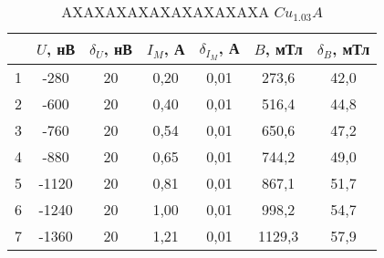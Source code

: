 \begin{table}
\centering
\caption{AXAXAXAXAXAXAXAXAXA $Cu_1.03A$}
\begin{tabular}{|c|c|c|c|c|c|c|}
\hline
 & $U$, нВ & $\delta_U$, нВ & $I_M$, А & $\delta_{I_M}$, А & $B$, мТл & $\delta_B$, мТл \\
\hline
1 & -280 & 20 & 0,20 & 0,01 & 273,6 & 42,0 \\
\cline{1-7}
2 & -600 & 20 & 0,40 & 0,01 & 516,4 & 44,8 \\
\cline{1-7}
3 & -760 & 20 & 0,54 & 0,01 & 650,6 & 47,2 \\
\cline{1-7}
4 & -880 & 20 & 0,65 & 0,01 & 744,2 & 49,0 \\
\cline{1-7}
5 & -1120 & 20 & 0,81 & 0,01 & 867,1 & 51,7 \\
\cline{1-7}
6 & -1240 & 20 & 1,00 & 0,01 & 998,2 & 54,7 \\
\cline{1-7}
7 & -1360 & 20 & 1,21 & 0,01 & 1129,3 & 57,9 \\
\cline{1-7}
\hline
\end{tabular}
\end{table}
